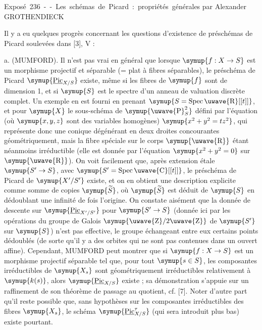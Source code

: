 \unit{Exposé 236 -- Les schémas de Picard : propriétés générales}
%
  {par Alexander GROTHENDIECK}


Il y a eu quelques progrès concernant les questions d'existence de préschémas
de Picard soulevées dans [3], V :

\medskip
\noindent a. (MUMFORD). Il n'est pas vrai en général que lorsque
$\symup{f:X\to S}$ est un morphisme projectif et séparable (= plat à
fibres séparables), le préschéma de Picard $\symup{\underline{\operatorname{Pic}}_{X/S}}$ existe,
même si les fibres de $\symup{f}$ sont de dimension 1, et si $\symup{S}$ est le spectre d'un
anneau de valuation discrète complet. Un exemple en est fourni en prenant
$\symup{S=\operatorname{Spec}\text{\uwave{R}}[[t]]}$, et pour $\symup{X}$ le sous-schéma de
$\symup{\text{\uwave{P}}^2_S}$ défini par l'équation (où $\symup{x,y,z}$ sont des variables
homogènes) $\symup{x^2+y^2=tz^2}$,
qui représente donc une conique dégénérant en deux droites concourantes
géométriquement, mais la fibre spéciale sur le corps $\symup{\text{\uwave{R}}}$ étant
néanmoins irréductible (elle est donnée par l'équation $\symup{x^2+y^2=0}$ sur
$\symup{\text{\uwave{R}}}$). On voit facilement que, après extension étale
$\symup{S'\to S}$, avec $\symup{S'=\operatorname{Spec}\text{\uwave{C}}[[t]]}$, le
préschéma de Picard de $\symup{X'/S'}$ existe, et on en obtient une description
explicite comme somme de copies $\symup{\widetilde S}$, où $\symup{\widetilde S}$ est déduit de
$\symup{S}$ en dédoublant une infinité de fois l'origine. On constate aisément que la
donnée de descente sur $\symup{\underline{\operatorname{Pic}}_{X'/S'}}$ pour
$\symup{S'\to S}$ (donnée ici par les opérations du groupe de Galois
$\symup{\text{\uwave{Z}}/2\text{\uwave{Z}}}$ de $\symup{S'}$ sur $\symup{S}$) n'est pas effective, le groupe
échangeant entre eux certains points dédoublés (de sorte qu'il y a des orbites
qui ne sont pas contenues dans un ouvert affine). Cependant, MUMFORD peut
montrer que si $\symup{f:X\to S}$ est un morphisme projectif séparable tel
que, pour tout $\symup{s\in S}$, les composantes irréductibles de $\symup{X_s}$ sont
géométriquement irréductibles relativement à $\symup{k(s)}$, alors
$\symup{\underline{\operatorname{Pic}}_{X/S}}$ existe ; sa démonstration s'appuie sur un
raffinement de son théorème de passage au quotient, cf. [7]. Noter d'autre part
qu'il reste possible que, sans hypothèses sur les composantes irréductibles des
fibres $\symup{X_s}$, le schéma $\symup{\underline{\operatorname{Pic}}^{\tau}_{X/S}}$ (qui sera introduit
plus bas) existe pourtant.

